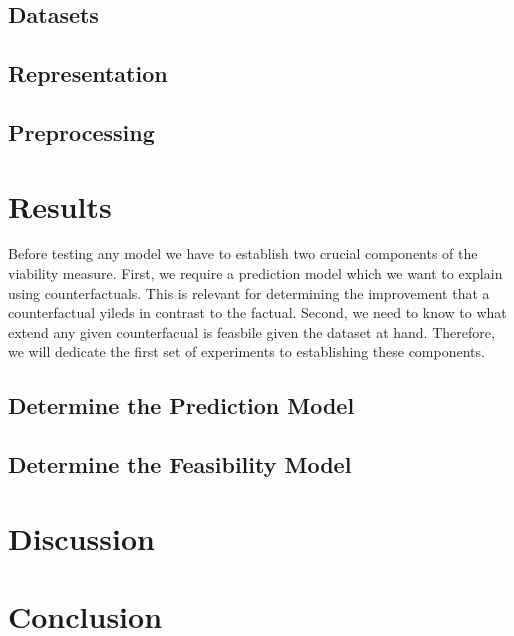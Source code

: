 \documentclass[12pt,a4paper]{report}
\begin{document}
\section{Datasets}
\label{sec:dataset_description}


\section{Representation}
\label{sec:representation}


\section{Preprocessing}
\label{sec:preprocessing}







\chapter{Results}
\label{sec:results}

Before testing any model we have to establish two crucial components of the viability measure. First, we require a prediction model which we want to explain using counterfactuals. This is relevant for determining the improvement that a counterfactual yileds in contrast to the factual. Second, we need to know to what extend any given counterfacual is feasbile given the dataset at hand. Therefore, we will dedicate the first set of experiments to establishing these components.

\section{Determine the Prediction Model}


\section{Determine the Feasibility Model}












\chapter{Discussion}
\label{sec:dicussion}


\chapter{Conclusion}
\label{sec:conclusion}


\printbibliography

\appendix
\end{document}

